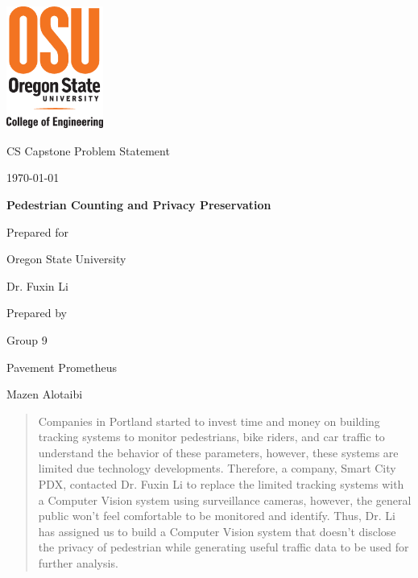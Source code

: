 \documentclass[onecolumn, draftclsnofoot,10pt, compsoc]{IEEEtran}
\def \CapstoneTeamName{		Pavement Prometheus}
\def \CapstoneTeamNumber{		9}
\def \GroupMemberOne{			Mazen Alotaibi}
\def \CapstoneProjectName{		Pedestrian Counting and Privacy Preservation}
\def \CapstoneSponsorCompany{	Oregon State University}
\def \CapstoneSponsorPerson{		Dr. Fuxin Li}
\def \DocType{		Problem Statement
				}
\newcommand{\NameSigPair}[1]{\par
\makebox[2.75in][r]{#1} \hfil 	\makebox[3.25in]{\makebox[2.25in]{\hrulefill} \hfill		\makebox[.75in]{\hrulefill}}
\par\vspace{-12pt} \textit{\tiny\noindent
\makebox[2.75in]{} \hfil		\makebox[3.25in]{\makebox[2.25in][r]{Signature} \hfill	\makebox[.75in][r]{Date}}}}
\renewcommand{\NameSigPair}[1]{#1}
\begin{document}
\begin{titlepage}
    \begin{singlespace}
    	\includegraphics[height=4cm]{images/coe_v_spot1}
        \hfill 
        \par\vspace{.2in}
        \centering
        \scshape{
            \huge CS Capstone \DocType \par
            {\large\today}\par
            \vspace{.5in}
            \textbf{\Huge\CapstoneProjectName}\par
            \vfill
            {\large Prepared for}\par
            \Huge \CapstoneSponsorCompany\par
            \vspace{5pt}
            {\Large\NameSigPair{\CapstoneSponsorPerson}\par}
            {\large Prepared by }\par
            Group\CapstoneTeamNumber\par
            \CapstoneTeamName\par 
            \vspace{5pt}
            {\Large
                \NameSigPair{\GroupMemberOne}\par
            }
            \vspace{20pt}
        }
        \begin{abstract}
        	Companies in Portland started to invest time and money on building tracking systems to monitor pedestrians, bike riders, and car traffic to understand the behavior of these parameters, however, these systems are limited due technology developments. Therefore,  a company, Smart City PDX, contacted Dr. Fuxin Li to replace the limited tracking systems with a Computer Vision system using surveillance cameras, however, the general public won't feel comfortable to be monitored and identify. Thus, Dr. Li \cite{li} has assigned us to build a Computer Vision system that doesn't disclose the privacy of pedestrian while generating useful traffic data to be used for further analysis.
        \end{abstract}     
    \end{singlespace}
\end{titlepage}
\newpage
{}
\tableofcontents
\clearpage
\end{document}
